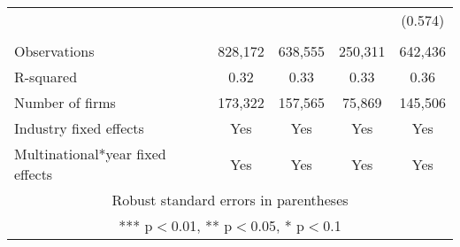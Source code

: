 \begin{tabular}{lcccc}
 &  &  &  & (0.574) \\
 &  &  &  &  \\
Observations & 828,172 & 638,555 & 250,311 & 642,436 \\
R-squared & 0.32 & 0.33 & 0.33 & 0.36 \\
Number of firms & 173,322 & 157,565 & 75,869 & 145,506 \\
Industry fixed effects & Yes & Yes & Yes & Yes \\
 Multinational*year fixed effects & Yes & Yes & Yes & Yes \\ \hline
\multicolumn{5}{c}{ Robust standard errors in parentheses} \\
\multicolumn{5}{c}{ *** p$<$0.01, ** p$<$0.05, * p$<$0.1} \\
\end{tabular}
